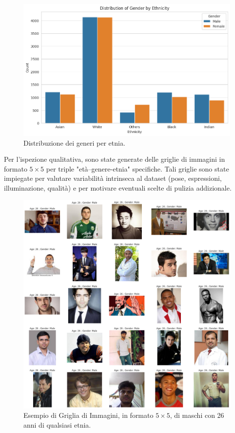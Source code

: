 \documentclass[a4paper,12pt]{report}
\begin{document}
	\begin{figure}[H]
		\centering
		\includegraphics[width=1.0\textwidth]{img/ethnic_bygender_image.png}
		\caption{Distribuzione dei generi per etnia.}
	\end{figure}
	
	Per l'ispezione qualitativa, sono state generate delle griglie di immagini in formato $5\times5$ per triple "età–genere-etnia" specifiche. Tali griglie sono state impiegate per valutare variabilità intrinseca al dataset (pose, espressioni, illuminazione, qualità) e per motivare eventuali scelte di pulizia addizionale.
	
	\begin{figure}[H]
		\centering
		\includegraphics[width=1.0\textwidth]{img/example_grid_image.png}
		\caption{Esempio di Griglia di Immagini, in formato $5\times5$, di maschi con 26 anni di qualsiasi etnia.}
	\end{figure}
	
\end{document}

